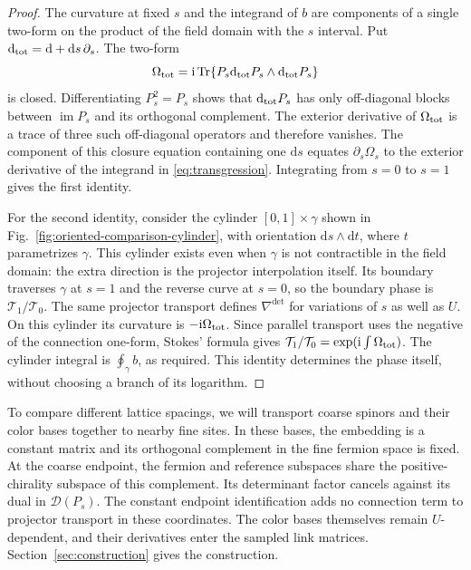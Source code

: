 \documentclass[11pt,a4paper]{article}
\theoremstyle{remark}
\DeclareMathOperator{\Tr}{Tr}
\DeclareMathOperator{\im}{im}
\newcommand{\dd}{\mathrm d}
\newcommand{\ii}{\mathrm i}
\begin{document}
\begin{proof}
The curvature at fixed \(s\) and the integrand of \(b\)
are components of a single two-form on the product of the
field domain with the \(s\) interval. Put
\(\dd_{\rm tot}=\dd+\dd s\,\partial_s\).
The two-form
\begin{equation}
 \Omega_{\rm tot}=\ii\Tr\{P_s\dd_{\rm tot}P_s
                                  \wedge\dd_{\rm tot}P_s\}
\end{equation}
is closed. Differentiating \(P_s^2=P_s\) shows that
\(\dd_{\rm tot}P_s\) has only off-diagonal blocks between
\(\im P_s\) and its orthogonal complement. The exterior
derivative of \(\Omega_{\rm tot}\) is a trace of three
such off-diagonal operators and therefore vanishes.
The component of this closure equation containing one
\(\dd s\) equates \(\partial_s\Omega_s\) to the
exterior derivative of the integrand in \eqref{eq:transgression}.
Integrating from \(s=0\) to \(s=1\) gives the first identity.

For the second identity, consider the cylinder
\([0,1]\times\gamma\) shown in
Fig.~\ref{fig:oriented-comparison-cylinder}, with orientation
\(\dd s\wedge\dd t\), where \(t\) parametrizes \(\gamma\).
This cylinder exists
even when \(\gamma\) is not contractible in the field domain:
the extra direction is the projector interpolation itself.
Its boundary traverses \(\gamma\) at \(s=1\) and the reverse curve at \(s=0\),
so the boundary phase is \(\mathcal T_1/\mathcal T_0\).
The same projector transport defines \(\nabla^{\det}\) for
variations of \(s\) as well as \(U\). On this cylinder its
curvature is \(-\ii\Omega_{\rm tot}\). Since parallel transport uses
the negative of the connection one-form, Stokes' formula gives
\(\mathcal T_1/\mathcal T_0=\exp(\ii\int\Omega_{\rm tot})\).
The cylinder integral is \(\oint_\gamma b\), as required.
This identity determines the phase itself, without choosing
a branch of its logarithm.
\end{proof}

To compare different lattice spacings, we will transport coarse
spinors and their color bases together to nearby fine sites.
In these bases, the embedding is a constant matrix and its
orthogonal complement in the fine fermion space is fixed.
At the coarse endpoint, the fermion and reference subspaces
share the positive-chirality subspace of this complement.
Its determinant factor cancels against its dual in
\(\mathcal D(P_s)\). The constant endpoint identification adds
no connection term to projector transport in these coordinates.
The color bases themselves remain \(U\)-dependent, and their
derivatives enter the sampled link matrices.
Section~\ref{sec:construction} gives the construction.
\end{document}
